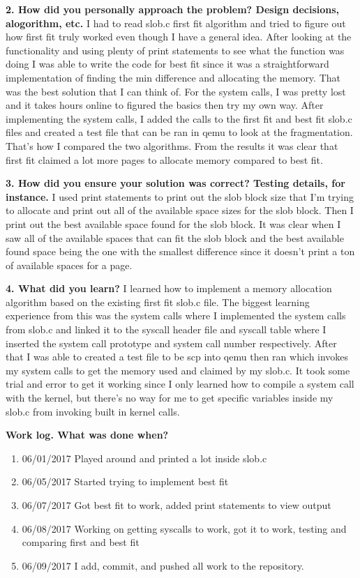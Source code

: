 \documentclass[letterpaper,10pt,titlepage,fleqn]{article}
\begin{document}
    \textbf{2. How did you personally approach the problem? Design decisions, alogorithm, etc.}
	I had to read slob.c first fit algorithm and tried to figure out how first fit truly worked even though I have a general idea. After looking at the functionality and using plenty of print statements to see what the function was doing I was able to write the code for best fit since it was a straightforward implementation of finding the min difference and allocating the memory. That was the best solution that I can think of. For the system calls, I was pretty lost and it takes hours online to figured the basics then try my own way. After implementing the system calls, I added the calls to the first fit and best fit slob.c files and created a test file that can be ran in qemu to look at the fragmentation. That's how I compared the two algorithms. From the results it was clear that first fit claimed a lot more pages to allocate memory compared to best fit.

    \textbf{3. How did you ensure your solution was correct? Testing details, for instance.}
    I used print statements to print out the slob block size that I'm trying to allocate and print out all of the available space sizes for the slob block. Then I print out the best available space found for the slob block. It was clear when I saw all of the available spaces that can fit the slob block and the best available found space being the one with the smallest difference since it doesn't print a ton of available spaces for a page.

    \textbf{4. What did you learn?}
	I learned how to implement a memory allocation algorithm based on the existing first fit slob.c file. The biggest learning experience from this was the system calls where I implemented the system calls from slob.c and linked it to the syscall header file and syscall table where I inserted the system call prototype and system call number respectively. After that I was able to created a test file to be scp into qemu then ran which invokes my system calls to get the memory used and claimed by my slob.c. It took some trial and error to get it working since I only learned how to compile a system call with the kernel, but there's no way for me to get specific variables inside my slob.c from invoking built in kernel calls.



\bigskip


\textbf{Work log. What was done when?}
\begin{enumerate}
\item 06/01/2017 Played around and printed a lot inside slob.c
\item 06/05/2017 Started trying to implement best fit
\item 06/07/2017 Got best fit to work, added print statements to view output
\item 06/08/2017 Working on getting syscalls to work, got it to work, testing and comparing first and best fit
\item 06/09/2017 I add, commit, and pushed all work to the repository.
\end{enumerate}
\end{document}
